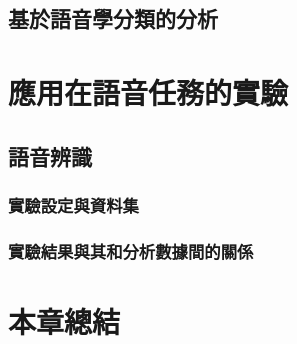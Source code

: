 \subsection{基於語音學分類的分析}



\newpage


\section{應用在語音任務的實驗}

\subsection{語音辨識}

\subsubsection{實驗設定與資料集}

\subsubsection{實驗結果與其和分析數據間的關係}



\section{本章總結}
